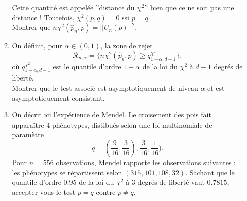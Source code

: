 \begin{enumerate}
\begin{enumerate}
Cette quantité est appelée ''distance du $\chi^2$'' bien que ce ne soit pas une distance ! Toutefois, $\chi^2(p,q)=0$ ssi $p=q$.\\
Montrer que $n\chi^2(\hat p_n,p)= ||U_n(p)||^2$.
\item On définit, pour $\alpha \in (0,1)$, la zone de rejet
\[\mathcal R_{n,\alpha}=\{n\chi^2(\hat p_n,p)\geq q_{1-\alpha, d-1}^{\chi^2}\},\]
où $q_{1-\alpha, d-1}^{\chi^2}$ est le quantile d'ordre $1-\alpha$ de la loi du $\chi^2$ à $d-1$ degrés de liberté.\\
Montrer que le test associé est asymptotiquement de niveau $\alpha$ et est asymptotiquement consistant.
\item{} On décrit ici l'expérience de Mendel. Le croisement des pois fait apparaître $4$ phénotypes, distibués selon une loi multinomiale de paramètre
\[ q =(\frac{9}{16},\frac{3}{16}),\frac{3}{16},\frac{1}{16}).\]
Pour $n=556$ observations, Mendel rapporte les observations suivantes : les phénotypes se répartissent selon $(315,101,108,32)$. Sachant que le quantile d'ordre $0.95$ de la loi du $\chi^2$ à $3$ degrés de liberté vaut $0.7815$, accepter vous le test $p=q$ contre $p\neq q$.
\end{enumerate}

\end{enumerate}
